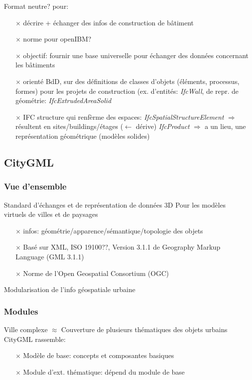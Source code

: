 \documentclass[11pt]{report}
\begin{document}
Format neutre? pour:
\begin{itemize}
\item[$\times$] décrire + échanger des infos de construction de bâtiment
\item[$\times$] norme pour openIBM?
\item[$\times$] objectif: fournir une base universelle pour échanger des données concernant les bâtiments
\item[$\times$] orienté BdD, sur des définitions de classes d'objets (éléments, processus, formes) pour les projets de construction (ex. d'entités: \textit{IfcWall}, de repr. de géométrie: \textit{IfcExtrudedAreaSolid}
\item[$\times$] IFC structure qui renfèrme des espaces: \textit{IfcSpatialStructureElement} $\Rightarrow$ résultent en sites/buildings/étages ($\longleftarrow$ dérive) \textit{IfcProduct} $\Rightarrow$ a un lieu, une représentation géométrique (modèles solides)
\end{itemize}

\subsection{CityGML} 

\subsubsection{Vue d'ensemble}

Standard d'échanges et de représentation de données 3D
Pour les modèles virtuels de villes et de paysages

\begin{itemize}
\item [$\times$] infos: géométrie/apparence/sémantique/topologie des objets
\item [$\times$] Basé sur XML, ISO 19100??, Version 3.1.1 de Geography Markup Language (GML 3.1.1)
\item [$\times$] Norme de l'Open Geospatial Consortium (OGC)
\end{itemize}

Modularisation de l'info géospatiale urbaine

\subsubsection{Modules}

Ville complexe $\approx$ Couverture de plusieurs thématiques des objets urbains
CityGML rassemble:
\begin{itemize}
\item [$\times$] Modèle de base: concepts et composantes basiques
\item [$\times$] Module d'ext. thématique: dépend du module de base\newline
\end{itemize}
\end{document}
